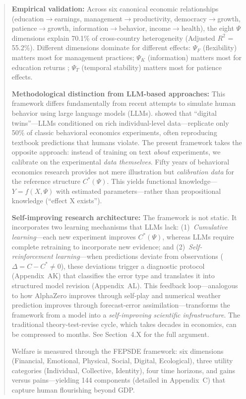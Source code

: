 \documentclass[12pt,a4paper]{article}
\begin{document}
\begin{abstract}
\textbf{Empirical validation:} Across six canonical economic relationships (education$\rightarrow$earnings, management$\rightarrow$productivity, democracy$\rightarrow$growth, patience$\rightarrow$growth, information$\rightarrow$behavior, income$\rightarrow$health), the eight $\Psi$ dimensions explain 70.1\% of cross-country heterogeneity (Adjusted $R^2$ = 55.2\%). Different dimensions dominate for different effects: $\Psi_F$ (flexibility) matters most for management practices; $\Psi_K$ (information) matters most for education returns \citep{hanushek2012}; $\Psi_T$ (temporal stability) matters most for patience effects.

\textbf{Methodological distinction from LLM-based approaches:} This framework differs fundamentally from recent attempts to simulate human behavior using large language models (LLMs). \citet{peng2025} showed that ``digital twins''---LLMs conditioned on rich individual-level data---replicate only 50\% of classic behavioral economics experiments, often reproducing textbook predictions that humans violate. The present framework takes the opposite approach: instead of training on text \emph{about} experiments, we calibrate on the experimental \emph{data themselves}. Fifty years of behavioral economics research provides not mere illustration but \emph{calibration data} for the reference structure $C^*(\Psi)$. This yields functional knowledge---$Y = f(X, \Psi)$ with estimated parameters---rather than propositional knowledge (``effect X exists'').

\textbf{Self-improving research architecture:} The framework is not static. It incorporates two learning mechanisms that LLMs lack: (1)~\emph{Cumulative learning}---each new experiment improves $C^*(\Psi)$, whereas LLMs require complete retraining to incorporate new evidence; and (2)~\emph{Self-reinforcement learning}---when predictions deviate from observations ($\Delta = C - C^* \neq 0$), these deviations trigger a diagnostic protocol (Appendix~AK) that classifies the error type and translates it into structured model revision (Appendix~AL). This feedback loop---analogous to how AlphaZero improves through self-play and numerical weather prediction improves through forecast-error assimilation---transforms the framework from a model into a \emph{self-improving scientific infrastructure}. The traditional theory-test-revise cycle, which takes decades in economics, can be compressed to months. See Section~4.X for the full argument.

Welfare is measured through the FEPSDE framework: six dimensions (Financial, Emotional, Physical, Social, Digital, Ecological), three utility categories (Individual, Collective, Identity), four time horizons, and gains versus pains---yielding 144 components (detailed in Appendix~C) that capture human flourishing beyond GDP.


\end{abstract}
\end{document}
